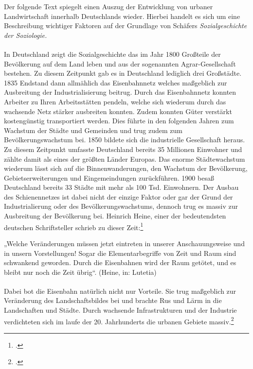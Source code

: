 \documentclass{scrartcl}
\begin{document}
Der folgende Text spiegelt einen Auszug der Entwicklung von urbaner Landwirtschaft innerhalb Deutschlands wieder. Hierbei handelt es sich um eine Beschreibung wichtiger Faktoren auf der Grundlage von Schäfers \textit{Sozialgeschichte der Soziologie.}\\
\\
In Deutschland zeigt die Sozialgeschichte das im Jahr 1800 Großteile der Bevölkerung auf dem Land leben und aus der sogenannten Agrar-Gesellschaft bestehen. Zu diesem Zeitpunkt gab es in Deutschland lediglich drei Großstädte. 1835 Endstand dann allmählich das Eisenbahnnetz welches maßgeblich zur Ausbreitung der Industrialisierung beitrug. Durch das Eisenbahnnetz konnten Arbeiter zu Ihren Arbeitsstätten pendeln, welche sich wiederum durch das wachsende Netz stärker ausbreiten konnten. Zudem konnten Güter verstärkt kostengünstig transportiert werden. Dies führte in den folgenden Jahren zum Wachstum der Städte und Gemeinden und trug zudem zum Bevölkerungswachstum bei. 1850 bildete sich die industrielle Gesellschaft heraus. Zu diesem Zeitpunkt umfasste Deutschland bereits 35 Millionen Einwohner und zählte damit als eines der größten Länder Europas. Das enorme Städtewachstum wiederum lässt sich auf die Binnenwanderungen, den Wachstum der Bevölkerung, Gebietserweiterungen und Eingemeindungen zurückführen. 1900 besaß Deutschland bereits 33 Städte mit mehr als 100 Tsd. Einwohnern. Der Ausbau des Schienennetzes ist dabei nicht der einzige Faktor oder gar der Grund der Industrialierung oder des Bevölkerungswachstums, dennoch trug es massiv zur Ausbreitung der Bevölkerung bei. Heinrich Heine, einer der bedeutendsten deutschen Schriftsteller schrieb zu dieser Zeit:\footcite[Vgl.][S. 17-21, 55-57]{Schafers2016SozialgeschichteSoziologie}

„Welche Veränderungen müssen jetzt eintreten in unserer Anschauungsweise und in unsern Vorstellungen! Sogar die Elementarbegriffe von Zeit und Raum sind schwankend geworden. Durch die Eisenbahnen wird der Raum getötet, und es bleibt nur noch die Zeit übrig“. (Heine, in: Lutetia)\\
\\
Dabei bot die Eisenbahn natürlich nicht nur Vorteile. Sie trug maßgeblich zur Veränderung des Landschaftsbildes bei und brachte Rus und Lärm in die Landschaften und Städte. Durch wachsende Infrastrukturen und der Industrie verdichteten sich im laufe der 20. Jahrhunderts die urbanen Gebiete massiv.\footcite[Vgl.][S. 57]{Schafers2016SozialgeschichteSoziologie}
\end{document}
